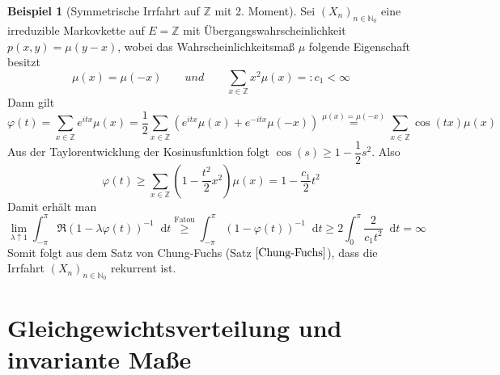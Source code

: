 \documentclass[a4paper,12pt]{scrartcl}
\theoremstyle{definition}
\newtheorem{bsp}{Beispiel}[section]
\newcommand*\diff{\mathop{}\!\mathrm{d}}
\begin{document}
\begin{bsp}[Symmetrische Irrfahrt auf $\mathbb{Z}$ mit 2. Moment]
Sei $(X_{n})_{n \in \mathbb{N}_{0}}$ eine irreduzible Markovkette auf $E=\mathbb{Z}$ mit Übergangswahrscheinlichkeit $p(x,y) = \mu (y-x)$, wobei das Wahrscheinlichkeitsmaß $\mu$ folgende Eigenschaft besitzt
\begin{equation*}
\mu (x) = \mu (-x) \qquad und \qquad \sum_{x \in \mathbb{Z}} x^{2} \mu(x) =: c_{1} < \infty
\end{equation*} 
Dann gilt
\begin{equation*}
\varphi(t) = \sum_{x \in \mathbb{Z}} e^{itx} \mu(x) = \dfrac{1}{2} \sum_{x \in \mathbb{Z}} \left( e^{itx} \mu(x) + e^{-itx} \mu(-x)  \right) \stackrel{\mu (x) = \mu (-x)}{=} \sum_{x \in \mathbb{Z}} \cos(tx)\mu(x)
\end{equation*}
Aus der Taylorentwicklung der Kosinusfunktion folgt $\cos(s) \geq 1 - \dfrac{1}{2} s^{2}$. Also
\begin{equation*}
\varphi(t) \geq  \sum_{x \in \mathbb{Z}} \left( 1 - \dfrac{t^{2}}{2} x^{2}\right) \mu(x) = 1 - \dfrac{c_{1}}{2} t^{2}
\end{equation*}
Damit erhält man 
\begin{equation*}
\lim_{\lambda \uparrow 1} \int_{-\pi}^{\pi} \mathfrak{R}(1 - \lambda \varphi(t))^{-1} \diff t \stackrel{\mathrm{Fatou}}{\geq} \int_{-\pi}^{\pi} (1 -  \varphi(t))^{-1} \diff t \geq 2 \int_{0}^{\pi} \dfrac{2}{c_{1} t^{2}} \diff t = \infty
\end{equation*}
Somit folgt aus dem Satz von Chung-Fuchs (Satz $\ref{Chung-Fuchs}$), dass die Irrfahrt $(X_{n})_{n \in \mathbb{N}_{0}}$ rekurrent ist.
\end{bsp}
\section{Gleichgewichtsverteilung und invariante Maße}
\end{document}
